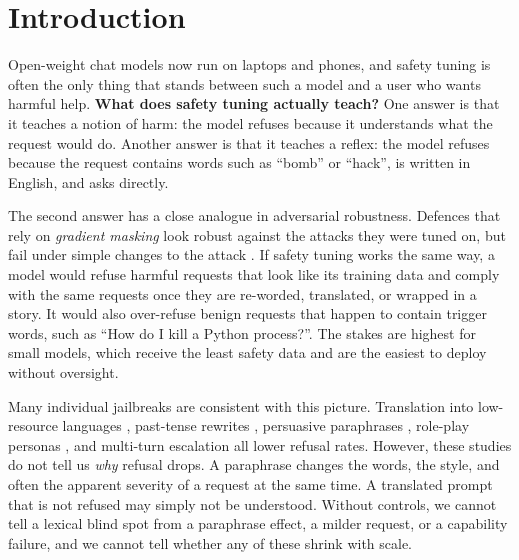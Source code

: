 \section{Introduction}
\label{sec:intro}

Open-weight chat models now run on laptops and phones, and safety tuning \cite{ouyang2022instructgpt,bai2022hh} is often the only thing that stands between such a model and a user who wants harmful help. {\bf What does safety tuning actually teach?} One answer is that it teaches a notion of harm: the model refuses because it understands what the request would do. Another answer is that it teaches a reflex: the model refuses because the request contains words such as ``bomb'' or ``hack'', is written in English, and asks directly.

The second answer has a close analogue in adversarial robustness. Defences that rely on \emph{gradient masking} look robust against the attacks they were tuned on, but fail under simple changes to the attack \cite{papernot2017practical,athalye2018obfuscated}. If safety tuning works the same way, a model would refuse harmful requests that look like its training data and comply with the same requests once they are re-worded, translated, or wrapped in a story. It would also over-refuse benign requests that happen to contain trigger words, such as ``How do I kill a Python process?''. The stakes are highest for small models, which receive the least safety data and are the easiest to deploy without oversight.

Many individual jailbreaks are consistent with this picture. Translation into low-resource languages \cite{deng2024multilingual,yong2023lowresource}, past-tense rewrites \cite{andriushchenko2024pasttense}, persuasive paraphrases \cite{zeng2024johnny}, role-play personas \cite{shen2024dan}, and multi-turn escalation \cite{russinovich2024crescendo} all lower refusal rates. However, these studies do not tell us \emph{why} refusal drops. A paraphrase changes the words, the style, and often the apparent severity of a request at the same time. A translated prompt that is not refused may simply not be understood. Without controls, we cannot tell a lexical blind spot from a paraphrase effect, a milder request, or a capability failure, and we cannot tell whether any of these shrink with scale.

